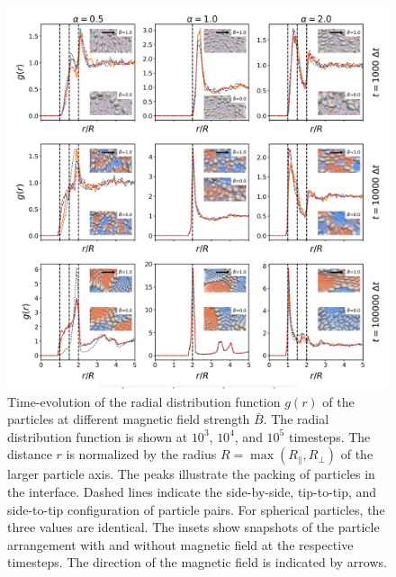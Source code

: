 \begin{figure}
\centering
\includegraphics[width=\textwidth]{figures/results/paper1/rdf_compare_time.png}
\caption{Time-evolution of the radial distribution function $g(r)$ of the particles at different magnetic 
        field strength $\bar{B}$. The radial distribution function is shown at $10^3$, $10^4$, and $10^5$ timesteps. 
        The distance $r$ is normalized by the radius $R=\max(R_\parallel,R_\perp)$ of the larger particle axis. The peaks 
        illustrate the packing of particles in the interface. Dashed lines indicate the side-by-side, tip-to-tip, 
        and side-to-tip configuration of particle pairs. For spherical particles, the three values are identical. 
        The insets show snapshots of the particle arrangement with and without magnetic field at the respective timesteps. 
        The direction of the magnetic field is indicated by arrows.}
\label{fig:rdf}
\end{figure}
